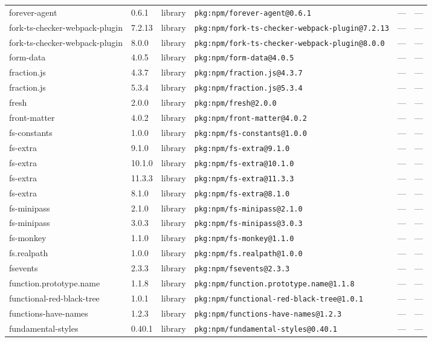 \documentclass[11pt]{article}
\begin{document}
\begin{longtable}{|l|l|l|p{2.2cm}|l|p{4cm}|}
forever-agent & 0.6.1 & library & \texttt{pkg:npm/forever-agent@0.6.1} & — & — \\
fork-ts-checker-webpack-plugin & 7.2.13 & library & \texttt{pkg:npm/fork-ts-checker-webpack-plugin@7.2.13} & — & — \\
fork-ts-checker-webpack-plugin & 8.0.0 & library & \texttt{pkg:npm/fork-ts-checker-webpack-plugin@8.0.0} & — & — \\
form-data & 4.0.5 & library & \texttt{pkg:npm/form-data@4.0.5} & — & — \\
fraction.js & 4.3.7 & library & \texttt{pkg:npm/fraction.js@4.3.7} & — & — \\
fraction.js & 5.3.4 & library & \texttt{pkg:npm/fraction.js@5.3.4} & — & — \\
fresh & 2.0.0 & library & \texttt{pkg:npm/fresh@2.0.0} & — & — \\
front-matter & 4.0.2 & library & \texttt{pkg:npm/front-matter@4.0.2} & — & — \\
fs-constants & 1.0.0 & library & \texttt{pkg:npm/fs-constants@1.0.0} & — & — \\
fs-extra & 9.1.0 & library & \texttt{pkg:npm/fs-extra@9.1.0} & — & — \\
fs-extra & 10.1.0 & library & \texttt{pkg:npm/fs-extra@10.1.0} & — & — \\
fs-extra & 11.3.3 & library & \texttt{pkg:npm/fs-extra@11.3.3} & — & — \\
fs-extra & 8.1.0 & library & \texttt{pkg:npm/fs-extra@8.1.0} & — & — \\
fs-minipass & 2.1.0 & library & \texttt{pkg:npm/fs-minipass@2.1.0} & — & — \\
fs-minipass & 3.0.3 & library & \texttt{pkg:npm/fs-minipass@3.0.3} & — & — \\
fs-monkey & 1.1.0 & library & \texttt{pkg:npm/fs-monkey@1.1.0} & — & — \\
fs.realpath & 1.0.0 & library & \texttt{pkg:npm/fs.realpath@1.0.0} & — & — \\
fsevents & 2.3.3 & library & \texttt{pkg:npm/fsevents@2.3.3} & — & — \\
function.prototype.name & 1.1.8 & library & \texttt{pkg:npm/function.prototype.name@1.1.8} & — & — \\
functional-red-black-tree & 1.0.1 & library & \texttt{pkg:npm/functional-red-black-tree@1.0.1} & — & — \\
functions-have-names & 1.2.3 & library & \texttt{pkg:npm/functions-have-names@1.2.3} & — & — \\
fundamental-styles & 0.40.1 & library & \texttt{pkg:npm/fundamental-styles@0.40.1} & — & — \\

\end{longtable}
\end{document}
